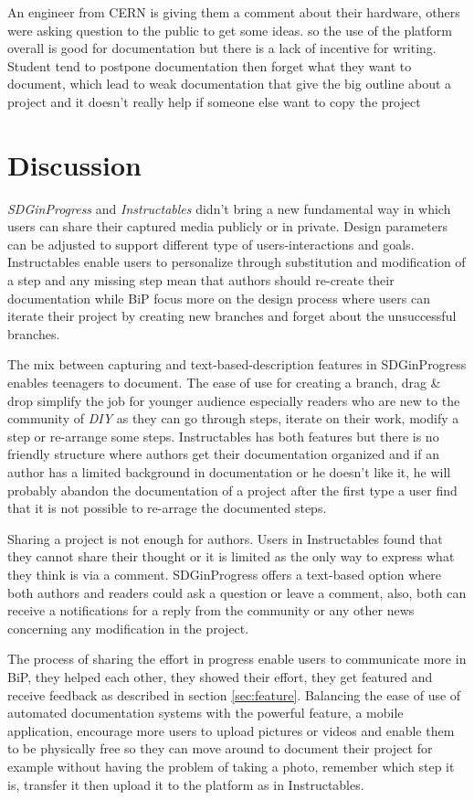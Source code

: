 An engineer from CERN is giving them a comment about their hardware, others were asking question to the public to get some ideas. so the use of the platform overall is good for documentation but there is a lack of incentive for writing. Student tend to postpone documentation then forget what they want to document, which lead to weak documentation that give the big outline about a project and it doesn't really help if someone else want to copy the project






\section{Discussion}

\textit{SDGinProgress} and \textit{Instructables} didn't bring a new fundamental way in which users can share their captured media publicly or in private. Design parameters can be adjusted to support different type of users-interactions and goals.  Instructables enable users to personalize through substitution and modification of a step and any missing step mean that authors should re-create their documentation while BiP focus more on the  design process where users can iterate their project by creating new branches and forget about the unsuccessful branches.

The mix between capturing and text-based-description features in SDGinProgress enables teenagers to document. The ease of use for creating a branch, drag \& drop simplify the job for younger audience especially readers who are new to the community of \textit{DIY} as they can go through steps, iterate on their work, modify a step or re-arrange some steps.  Instructables has both features but there is no friendly structure where authors get their documentation organized and if an author has a limited background in documentation or he doesn't like it, he will probably abandon the documentation of a project after the first type a user find that it is not possible to re-arrage the documented steps.

Sharing a project is not enough for authors. Users in Instructables found that they cannot share their thought or it is limited as the only way to express what they think is via a comment. SDGinProgress offers a text-based option where both authors and readers could ask a question or leave a comment, also, both can receive a notifications for a reply from the community or any other news concerning any modification in the project.

The process of sharing the effort in progress enable users to communicate more in BiP, they helped each other, they showed their effort, they get featured and receive feedback as described in section \ref{sec:feature}. Balancing the ease of use of automated documentation systems with the powerful feature, a mobile application, encourage more users to upload pictures or videos and enable them to be physically free so they can move around to document their project for example without having the problem of taking a photo, remember which step it is, transfer it then upload it to the platform as in Instructables.